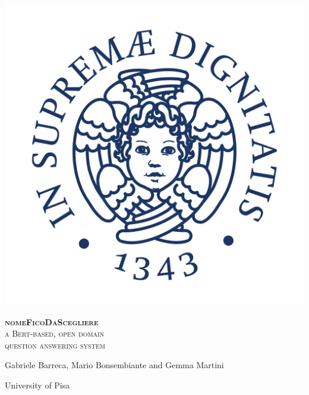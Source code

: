 \documentclass[12pt,a4paper,hidelinks]{article}
\newcommand{\nomefico}{\textbf{nomeFicoDaScegliere}}
\begin{document}
\begin{titlepage}
    \centering
    \begin{minipage}{0.22\textwidth}%
        \includegraphics[width=\linewidth]{pics/Cherubino.jpg}
    \end{minipage}\hspace{10pt}
    \begin{minipage}{0.6\textwidth}%
        \flushright
        \large
        \vspace{0.8cm}
        \textsc{\color{pblue}%
        \nomefico\\
        a Bert-based, open domain\\
        question answering system}
    \end{minipage}%

    
    
    
    
        \vspace{1.2cm}
    
        Gabriele Barreca, Mario Bonsembiante {\small and} Gemma Martini
        
        \vspace{0.7cm}
        
        University of Pisa
      
        \vspace{1.5cm}
        
    
    \vfill
\end{titlepage}
\end{document}
